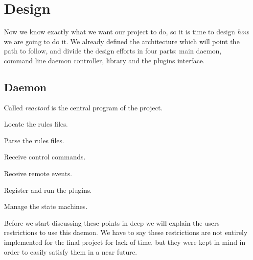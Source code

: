 \chapter{Design}
Now we know exactly what we want our project to do, so it is time to design \emph{how} we are going to do it. We already defined the
architecture which will point the path to follow, and divide the design efforts in four parts: main daemon, command line daemon controller,
library and the plugins interface.
\section{Daemon}
Called \emph{reactord} is the central program of the project.
\begin{list}{-}{It mainly has to:}
  \item Locate the rules files.
  \item Parse the rules files.
  \item Receive control commands.
  \item Receive remote events.
  \item Register and run the plugins.
  \item Manage the state machines.
\end{list}
Before we start discussing these points in deep we will explain the users restrictions to use this daemon. We have to say these 
restrictions are not entirely implemented for the final project for lack of time, but they were kept in mind in order to easily satisfy 
them in a near future.
